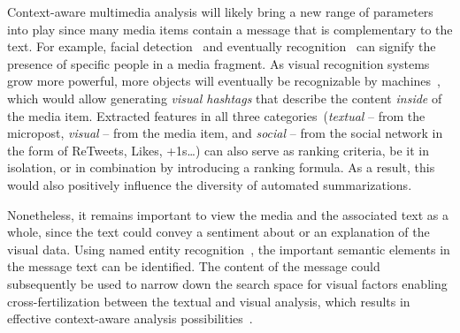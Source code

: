 Context-aware multimedia analysis will likely bring a new range of parameters into play since many media items contain a message that is complementary to the text. For example, facial detection~\cite{ViolaJones} and eventually recognition~\cite{Wright} can signify the presence of specific people in a media fragment.
As visual recognition systems grow more powerful, more objects will eventually be recognizable by machines~\cite{Serre}, which would allow generating \emph{visual hashtags} that describe the content \emph{inside} of the media item. Extracted features in all three categories~(\emph{textual} -- from the micropost, \emph{visual} -- from the media item, and \emph{social} -- from the social network in the form of ReTweets, Likes, +1s\ldots) can also serve as ranking criteria, be it in isolation, or in combination by introducing a ranking formula. As a result, this would also positively influence the diversity of automated summarizations.

Nonetheless, it remains important to view the media and the associated text as a whole, since the text could convey a sentiment about or an explanation of the visual data. Using named entity recognition~\cite{NERD,AddingMeaningToMicroposts}, the important semantic elements in the message text can be identified. The content of the message could subsequently be used to narrow down the search space for visual factors enabling cross-fertilization between the textual and visual analysis, which results in effective context-aware analysis possibilities~\cite{verborgh_mtap_2011}.
